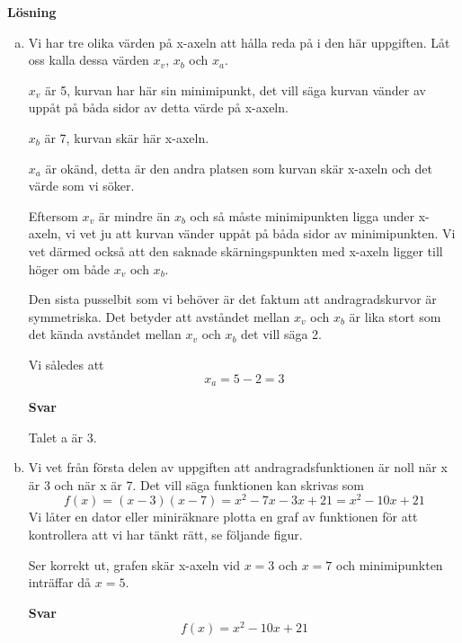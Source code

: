 \documentclass[fleqn]{article}
\begin{document}
\textbf{Lösning}
\begin{enumerate}[(a)]
\item
Vi har tre olika värden på x-axeln att hålla reda på i den här uppgiften. Låt oss kalla dessa värden $x_v$, $x_b$ och $x_a$.

$x_v$ är 5, kurvan har här sin minimipunkt, det vill säga kurvan vänder av uppåt på båda sidor av detta värde på x-axeln.

$x_b$ är 7, kurvan skär här x-axeln.

$x_a$ är okänd, detta är den andra platsen som kurvan skär x-axeln och det värde som vi söker.

Eftersom $x_v$ är mindre än $x_b$ och så måste minimipunkten ligga under x-axeln, vi vet ju att kurvan vänder uppåt på båda sidor av minimipunkten. Vi vet därmed också att den saknade skärningspunkten med x-axeln ligger till höger om både $x_v$ och $x_b$.

Den sista pusselbit som vi behöver är det faktum att andragradskurvor är symmetriska. Det betyder att avståndet mellan $x_v$ och $x_b$ är lika stort som det kända avståndet mellan $x_v$ och $x_b$ det vill säga 2.

Vi således att
\[
x_a = 5 - 2 = 3
\]

\textbf{Svar}

Talet a är 3. 

\item
Vi vet från första delen av uppgiften att andragradsfunktionen är noll när x är 3 och när x är 7. Det vill säga funktionen kan skrivas som
\[
f(x) = (x-3)(x-7) = x^2 - 7x - 3x + 21 = x^2 - 10x + 21  
\]
Vi låter en dator eller miniräknare plotta en graf av funktionen för att kontrollera att vi har tänkt rätt, se följande figur.


Ser korrekt ut, grafen skär x-axeln vid $x=3$ och $x=7$ och minimipunkten inträffar då $x=5$.

\textbf{Svar}
\[
f(x) = x^2 - 10x + 21
\]

\end{enumerate}
\end{document}
